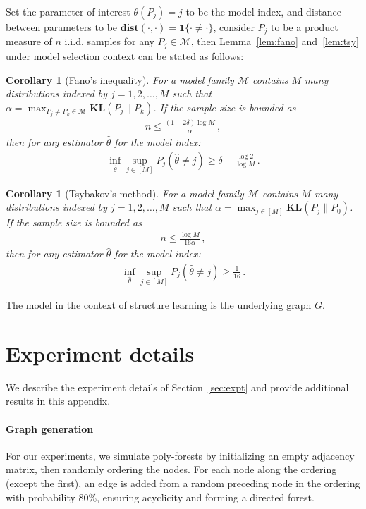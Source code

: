 \documentclass{article}
\newtheorem{corollary}[theorem]{Corollary}
\theoremstyle{definition}
\theoremstyle{definition}
\theoremstyle{definition}
\theoremstyle{definition}
\theoremstyle{definition}
\theoremstyle{definition}
\theoremstyle{remark}
\theoremstyle{remark}
\begin{document}
\noindent
Set the parameter of interest $\theta(P_j)=j$ to be the model index, and distance between parameters to be $\mathbf{dist}(\cdot,\cdot) = \mathbf{1}\{\cdot \ne \cdot\}$, consider $P_j$ to be a product measure of $n$ i.i.d. samples for any $P_j\in \mathcal{M}$, then Lemma~\ref{lem:fano} and~\ref{lem:tsy} under model selection context can be stated as follows:
\begin{corollary}[Fano's inequality]\label{coro:fano}
For a model family $\mathcal{M}$ contains $M$ many distributions indexed by $j=1,2,\ldots,M$ such that 
$\alpha= \max_{P_j\ne P_k\in\mathcal{M}}\mathbf{KL}(P_j\| P_k)$. 
If the sample size is bounded as
\begin{align*}
    n \le \frac{(1-2\delta)\log M}{\alpha} \,,
\end{align*}
then for any estimator $\widehat{\theta}$ for the model index:
\begin{align*}
    \inf_{\widehat{\theta}}\sup_{j\in[M]} P_j(\widehat{\theta}\ne j) \ge \delta - \frac{\log 2}{\log M} \,.
\end{align*}
\end{corollary}
\begin{corollary}[Tsybakov's method]\label{coro:tsy}
    For a model family $\mathcal{M}$ contains $M$ many distributions indexed by $j=1,2,\ldots,M$ such that 
    $\alpha= \max_{j\in[M]}\mathbf{KL}(P_j\| P_0)$. 
    If the sample size is bounded as
    \begin{align*}
        n \le \frac{\log M}{16 \alpha} \,,
    \end{align*}
    then for any estimator $\widehat{\theta}$ for the model index:
    \begin{align*}
        \inf_{\widehat{\theta}}\sup_{j\in[M]} P_j(\widehat{\theta}\ne j) \ge \frac{1}{16} \,.
    \end{align*}
\end{corollary}
The model in the context of structure learning is the underlying graph $G$.


\section{Experiment details}\label{app:expt}
We describe the experiment details of Section~\ref{sec:expt} and provide additional results in this appendix.


\paragraph{Graph generation}
For our experiments, we simulate
poly-forests by initializing an empty adjacency matrix, then randomly ordering the nodes. For each node along the ordering (except the first), an edge is added from a random preceding node in the ordering with probability 80\%, ensuring acyclicity and forming a directed forest. 
\end{document}
